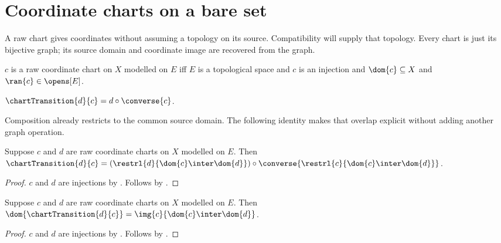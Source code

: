 \section{Coordinate charts on a bare set}



A raw chart gives coordinates without assuming a topology on its source.
Compatibility will supply that topology. Every chart is just its bijective
graph; its source domain and coordinate image are recovered from the graph.

\begin{definition}\label{raw_coordinate_chart}
    $c$ is a raw coordinate chart on $X$ modelled on $E$ iff
        $E$ is a topological space and $c$ is an injection and
        $\dom{c}\subseteq X$ and $\ran{c}\in\opens[E]$.
\end{definition}

\begin{definition}\label{chart_transition}
    $\chartTransition{d}{c}=d\circ\converse{c}$.
\end{definition}

Composition already restricts to the common source domain. The following
identity makes that overlap explicit without adding another graph operation.

\begin{theorem}\label{chart_transition_overlap}
    Suppose $c$ and $d$ are raw coordinate charts on $X$ modelled on $E$.
    Then $\chartTransition{d}{c}
        =(\restrl{d}{\dom{c}\inter\dom{d}})
            \circ\converse{\restrl{c}{\dom{c}\inter\dom{d}}}$.
\end{theorem}
\begin{proof}
    $c$ and $d$ are injections by .
    Follows by .
\end{proof}

\begin{theorem}\label{chart_transition_domain}
    Suppose $c$ and $d$ are raw coordinate charts on $X$ modelled on $E$.
    Then $\dom{\chartTransition{d}{c}}
        =\img{c}{\dom{c}\inter\dom{d}}$.
\end{theorem}
\begin{proof}
    $c$ and $d$ are injections by .
    Follows by .
\end{proof}


